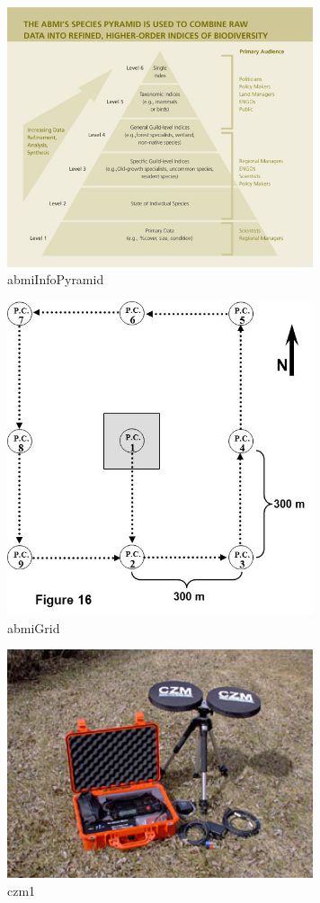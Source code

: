 \documentclass[12pt,oneside]{book}
\begin{document}
\begin{figure}[h]
\centering
\includegraphics[width=90mm]{figures/abmiInfoPyramid.jpg}
\caption{abmiInfoPyramid}
\label{fig:abmiInfoPyramid}
\end{figure}

\begin{figure}[h]
\centering
\includegraphics[width=90mm]{figures/abmiGrid.jpg}
\caption{abmiGrid}
\label{fig:abmiGrid}
\end{figure}

\begin{figure}[h]
\centering
\includegraphics[width=90mm]{figures/czm1.jpg}
\caption{czm1}
\label{fig:czm1}
\end{figure}
\end{document}
